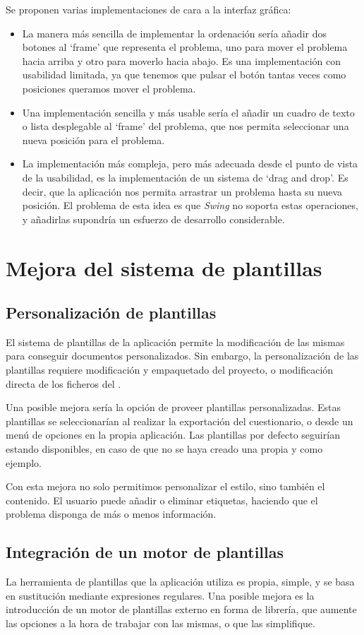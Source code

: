 Se proponen varias implementaciones de cara a la interfaz gráfica:
\begin{itemize}
	\item La manera más sencilla de implementar la ordenación sería añadir dos botones al `frame' que representa el problema, uno para mover el problema hacia arriba y otro para moverlo hacia abajo.
	Es una implementación con usabilidad limitada, ya que tenemos que pulsar el botón tantas veces como posiciones queramos mover el problema.
	\item Una implementación sencilla y más usable sería el añadir un cuadro de texto o lista desplegable al `frame' del problema, que nos permita seleccionar una nueva posición para el problema.
	\item La implementación más compleja, pero más adecuada desde el punto de vista de la usabilidad, es la implementación de un sistema de `drag and drop'.
	Es decir, que la aplicación nos permita arrastrar un problema hasta su nueva posición.
	El problema de esta idea es que \emph{Swing} no soporta estas operaciones, y añadirlas supondría un esfuerzo de desarrollo considerable.
\end{itemize}

\section{Mejora del sistema de plantillas}
\subsection{Personalización de plantillas}
El sistema de plantillas de la aplicación permite la modificación de las mismas para conseguir documentos personalizados.
Sin embargo, la personalización de las plantillas requiere modificación y empaquetado del proyecto, o modificación directa de los ficheros del .

Una posible mejora sería la opción de proveer plantillas personalizadas.
Estas plantillas se seleccionarían al realizar la exportación del cuestionario, o desde un menú de opciones en la propia aplicación.
Las plantillas por defecto seguirían estando disponibles, en caso de que no se haya creado una propia y como ejemplo.

Con esta mejora no solo permitimos personalizar el estilo, sino también el contenido.
El usuario puede añadir o eliminar etiquetas, haciendo que el problema disponga de más o menos información.

\subsection{Integración de un motor de plantillas}
La herramienta de plantillas que la aplicación utiliza es propia, simple, y se basa en sustitución mediante expresiones regulares.
Una posible mejora es la introducción de un motor de plantillas externo en forma de librería, que aumente las opciones a la hora de trabajar con las mismas, o que las simplifique.

